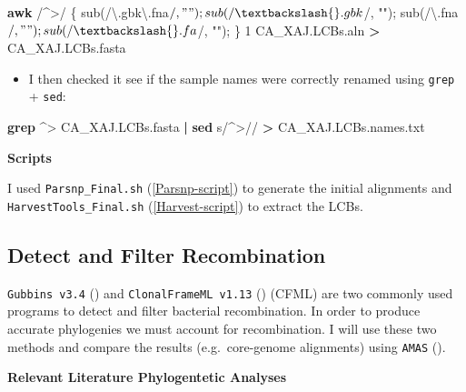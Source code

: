 \documentclass[
]{book}
\newenvironment{Shaded}{\begin{snugshade}}{\end{snugshade}}
\newcommand{\FunctionTok}[1]{\textcolor[rgb]{0.13,0.29,0.53}{\textbf{#1}}}
\newcommand{\KeywordTok}[1]{\textcolor[rgb]{0.13,0.29,0.53}{\textbf{#1}}}
\newcommand{\NormalTok}[1]{#1}
\newcommand{\OperatorTok}[1]{\textcolor[rgb]{0.81,0.36,0.00}{\textbf{#1}}}
\newcommand{\StringTok}[1]{\textcolor[rgb]{0.31,0.60,0.02}{#1}}
\providecommand{\tightlist}{%
  \setlength{\itemsep}{0pt}\setlength{\parskip}{0pt}}
\begin{document}
\begin{Shaded}
\begin{Highlighting}[]
      \FunctionTok{awk} \StringTok{\textquotesingle{}/\^{}\textgreater{}/ \{ sub(/\textbackslash{}.gbk\textbackslash{}.fna$/, ""); sub(/\textbackslash{}.gbk$/, ""); sub(/\textbackslash{}.fna$/, ""); sub(/\textbackslash{}.fa$/, ""); \} 1\textquotesingle{}}\NormalTok{ CA\_XAJ.LCBs.aln }\OperatorTok{\textgreater{}}\NormalTok{ CA\_XAJ.LCBs.fasta}
\end{Highlighting}
\end{Shaded}

\begin{itemize}
\tightlist
\item
  I then checked it see if the sample names were correctly renamed using \texttt{grep} + \texttt{sed}:
\end{itemize}

\begin{Shaded}
\begin{Highlighting}[]
      \FunctionTok{grep} \StringTok{\textquotesingle{}\^{}\textgreater{}\textquotesingle{}}\NormalTok{ CA\_XAJ.LCBs.fasta }\KeywordTok{|} \FunctionTok{sed} \StringTok{\textquotesingle{}s/\^{}\textgreater{}//\textquotesingle{}} \OperatorTok{\textgreater{}}\NormalTok{ CA\_XAJ.LCBs.names.txt }
\end{Highlighting}
\end{Shaded}

\textbf{Scripts}

I used \texttt{Parsnp\_Final.sh} (\ref{Parsnp-script}) to generate the initial alignments and \texttt{HarvestTools\_Final.sh} (\ref{Harvest-script}) to extract the LCBs.

\subsection{Detect and Filter Recombination}\label{detect-and-filter-recombination}

\texttt{Gubbins\ v3.4} (\citet{croucher2015}) and \texttt{ClonalFrameML\ v1.13} (\citet{didelot2015}) (CFML) are two commonly used programs to detect and filter bacterial recombination. In order to produce accurate phylogenies we must account for recombination. I will use these two methods and compare the results (e.g.~core-genome alignments) using \texttt{AMAS} (\citet{borowiec2016}).

\textbf{Relevant Literature Phylogentetic Analyses}
\end{document}
